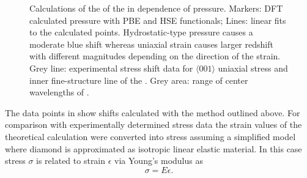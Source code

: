 	\begin{figure}[!htb]
		\centering
		\caption[Calculated dependence between \siv \ZPL and lattice pressure]{Calculations of the \wl of the \siv \ZPL in dependence of pressure. Markers: DFT calculated pressure with PBE and HSE functionals; Lines: linear fits to the calculated points. Hydrostatic-type pressure causes a moderate blue shift whereas uniaxial strain causes larger redshift with different magnitudes depending on the direction of the strain. Grey line: experimental stress shift data for $\langle 001 \rangle$ uniaxial stress and inner fine-structure line of the \siv. Grey area: range of \ZPL center wavelengths of \vl.}
		\label{fig::stress_pressure}
	\end{figure}

	The data points in  show \ZPL \cwl shifts calculated with the method outlined above. For comparison with experimentally determined stress data the strain values of the theoretical calculation were converted into stress assuming a simplified model where diamond is approximated as isotropic linear elastic material. In this case stress $\sigma$ is related to strain $\epsilon$ via Young’s modulus as
% 
	\begin{equation}
		\sigma = E \epsilon .
	\end{equation}

